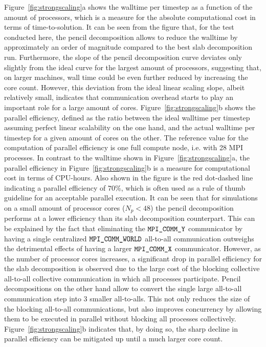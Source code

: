 Figure~\ref{fig:strongscaling}a shows the walltime per timestep as a function of the amount of processors, which is a measure for the absolute computational cost in terms of time-to-solution. It can be seen from the figure that, for the test conducted here, the pencil decomposition allows to reduce the walltime by approximately an order of magnitude compared to the best slab decomposition run. Furthermore, the slope of the pencil decomposition curve deviates only slightly from the ideal curve for the largest amount of processors, suggesting that, on larger machines, wall time could be even further reduced by increasing the core count. However, this deviation from the ideal linear scaling slope, albeit relatively small, indicates that communication overhead starts to play an important role for a large amount of cores. Figure~\ref{fig:strongscaling}b shows the parallel efficiency, defined as the ratio between the ideal walltime per timestep assuming perfect linear scalability on the one hand, and the actual walltime per timestep for a given amount of cores on the other. The reference value for the computation of parallel efficiency is one full compute node, i.e. with 28 MPI processes. In contrast to the walltime shown in Figure~\ref{fig:strongscaling}a, the parallel efficiency in Figure~\ref{fig:strongscaling}b is a measure for computational cost in terms of CPU-hours. Also shown in the figure is the red dot-dashed line indicating a parallel efficiency of $70\%$, which is often used as a rule of thumb guideline for an acceptable parallel execution. It can be seen that for simulations on a small amount of processor cores ($N_p < 48$) the pencil decomposition performs at a lower efficiency than its slab decomposition counterpart. This can be explained by the fact that eliminating the $\verb|MPI_COMM_Y|$ communicator by having a single centralized $\verb|MPI_COMM_WORLD|$ all-to-all communication outweighs the detrimental effects of having a larger $\verb|MPI_COMM_X|$ communicator. However, as the number of processor cores increases, a significant drop in parallel efficiency for the slab decomposition is observed due to the large cost of the blocking collective all-to-all collective communication in which all processes participate. Pencil decompositions on the other hand allow to convert the single large all-to-all communication step into 3 smaller all-to-alls. This not only reduces the size of the blocking all-to-all communications, but also improves concurrency by allowing them to be executed in parallel without blocking all processes collectively. Figure~\ref{fig:strongscaling}b indicates that, by doing so, the sharp decline in parallel efficiency can be mitigated up until a much larger core count. 

